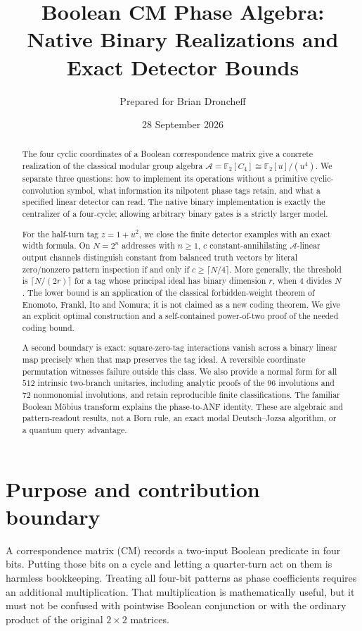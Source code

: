 \documentclass[11pt,a4paper]{article}
\title{Boolean CM Phase Algebra:\\Native Binary Realizations and Exact Detector Bounds}
\author{Prepared for Brian Droncheff}
\date{28 September 2026}
\theoremstyle{definition}\newtheorem{definition}[theorem]{Definition}
\theoremstyle{remark}\newtheorem{remark}[theorem]{Remark}
\newcommand{\F}{\mathbb F}
\newcommand{\A}{\mathcal A}
\numberwithin{equation}{section}
\begin{document}
\maketitle
\begin{abstract}
The four cyclic coordinates of a Boolean correspondence matrix give a concrete realization of the classical modular group algebra $\A=\F_2[C_4]\cong\F_2[u]/(u^4)$. We separate three questions: how to implement its operations without a primitive cyclic-convolution symbol, what information its nilpotent phase tags retain, and what a specified linear detector can read. The native binary implementation is exactly the centralizer of a four-cycle; allowing arbitrary binary gates is a strictly larger model.

For the half-turn tag $z=1+u^2$, we close the finite detector examples with an exact width formula. On $N=2^n$ addresses with $n\ge1$, $c$ constant-annihilating $\A$-linear output channels distinguish constant from balanced truth vectors by literal zero/nonzero pattern inspection if and only if $c\ge\lceil N/4\rceil$. More generally, the threshold is $\lceil N/(2r)\rceil$ for a tag whose principal ideal has binary dimension $r$, when $4$ divides $N$. The lower bound is an application of the classical forbidden-weight theorem of Enomoto, Frankl, Ito and Nomura; it is not claimed as a new coding theorem. We give an explicit optimal construction and a self-contained power-of-two proof of the needed coding bound.

A second boundary is exact: square-zero-tag interactions vanish across a binary linear map precisely when that map preserves the tag ideal. A reversible coordinate permutation witnesses failure outside this class. We also provide a normal form for all $512$ intrinsic two-branch unitaries, including analytic proofs of the $96$ involutions and $72$ nonmonomial involutions, and retain reproducible finite classifications. The familiar Boolean M\"obius transform explains the phase-to-ANF identity. These are algebraic and pattern-readout results, not a Born rule, an exact modal Deutsch--Jozsa algorithm, or a quantum query advantage.
\end{abstract}

\section{Purpose and contribution boundary}\label{sec:scope}
A correspondence matrix (CM) records a two-input Boolean predicate in four bits. Putting those bits on a cycle and letting a quarter-turn act on them is harmless bookkeeping. Treating all four-bit patterns as phase coefficients requires an additional multiplication. That multiplication is mathematically useful, but it must not be confused with pointwise Boolean conjunction or with the ordinary product of the original $2\times2$ matrices.
\end{document}
